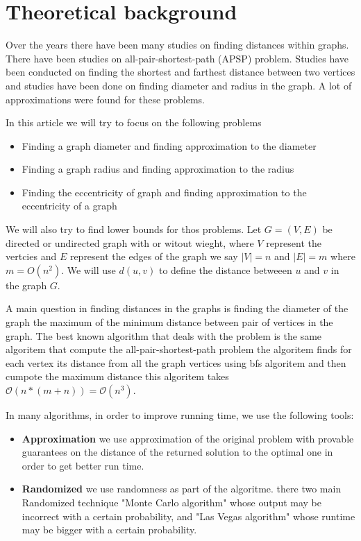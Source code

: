 \section{Theoretical background}

Over the years there have been many studies on ﬁnding distances within graphs. There have been studies on all-pair-shortest-path (APSP) problem. Studies have been conducted on ﬁnding the shortest and farthest distance between two vertices and studies have been done on ﬁnding diameter and radius in the graph.
A lot of approximations were found for these problems.

\newline In this article we will try to focus on the following problems
\begin{itemize}
    \item Finding a graph diameter and finding approximation to the diameter
    \item Finding a graph radius and finding approximation to the radius
    \item Finding the eccentricity of graph and finding approximation to the eccentricity of a graph
\end{itemize}
We will also try to find lower bounds for thos problems.
\newline\newline Let $G=(V,E)$ be directed or undirected graph with or witout wieght, where $V$ represent the vertcies and $E$ represent the edges of the graph we say $|V|=n$ and $|E|=m$ where $m =O(n^2)$.
We will use $d(u,v)$ to define the distance betweeen $u$ and $v$ in the graph $G$.

A main question in finding distances in the graphs is finding the diameter of the graph the maximum of the minimum distance between pair of vertices in the graph. The best known algorithm that deals with the problem is the same algoritem that compute the all-pair-shortest-path problem the algoritem finds for each vertex its distance from all the graph vertices using bfs algoritem and then cumpote the maximum distance this algoritem takes $\mathcal{O}(n*(m+n))=\mathcal{O}(n^3)$.

In many algorithms, in order to improve running time, we use the following tools:
\begin{itemize}
    \item \textbf{Approximation} we use approximation of the original problem with provable guarantees on the distance of the returned solution to the optimal one in order to get better run time.
    \item  \textbf{Randomized} we use randomness as part of the algoritme. there two main Randomized technique "Monte Carlo algorithm" whose output may be incorrect with a certain probability, and "Las Vegas algorithm" whose runtime may be bigger with a certain probability.
\end{itemize}


